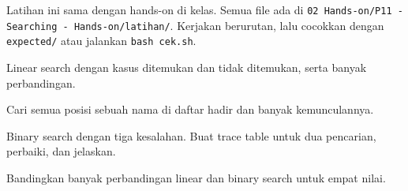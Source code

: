 \documentclass[a4paper]{article}
\begin{document}
Latihan ini sama dengan hands-on di kelas. Semua file ada di \texttt{02 Hands-on/P11 - Searching - Hands-on/latihan/}. Kerjakan berurutan, lalu cocokkan dengan \texttt{expected/} atau jalankan \texttt{bash cek.sh}.
\par\vspace{4pt}\par\vspace{6pt}
Linear search dengan kasus ditemukan dan tidak ditemukan, serta banyak perbandingan.

Cari semua posisi sebuah nama di daftar hadir dan banyak kemunculannya.

Binary search dengan tiga kesalahan. Buat trace table untuk dua pencarian, perbaiki, dan jelaskan.

Bandingkan banyak perbandingan linear dan binary search untuk empat nilai.
\end{document}
